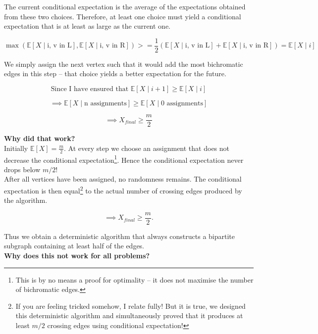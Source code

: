 The current conditional expectation is the average of the expectations obtained
from these two choices. Therefore, at least one choice must yield a conditional
expectation that is at least as large as the current one.

\[
\max \left( \mathbb E[X \mid \text{i, v in L}], \mathbb E[X \mid \text{i, v in R}] \right) >= \frac{1}{2} \left(\mathbb E[X \mid \text{i, v in L}] + \mathbb E[X \mid \text{i, v in R}] \right) = \mathbb E[X \mid i]
\]


We simply assign the next vertex such that it would add the most 
bichromatic edges in this step -- that choice yields a better expectation for the future.
\vspace{0.5em}

\[
\text{Since I have ensured that }\mathbb E[X \mid i+1] \ge \mathbb E[X \mid i]
\]

\[
\implies \mathbb E[X \mid \text{n assignments}] \ge \mathbb E[X \mid \text{0 assignments}]
\]

\[
\implies X_{final} \ge \frac{m}{2}
\]

\vspace{0.5em}

\noindent\textbf{Why did that work?}\\


\noindent Initially $\mathbb E[X]=\frac{m}{2}$. At every step we choose an 
assignment that does not decrease the conditional
expectation\footnote{This is by no means a proof for optimality -- it does not 
maximise the number of bichromatic edges.}. Hence the conditional expectation never drops below \(m/2\)!\\


\noindent After all vertices have been assigned, no randomness remains. The conditional
expectation is then equal\footnote{If you are feeling tricked somehow, 
I relate fully! But it is true, we designed this deterministic algorithm and simultaneously proved that 
it produces at least \(m/2\) crossing edges using conditional expectation!} to the 
actual number of crossing edges produced by the algorithm.

\[
\implies
X_{final} \ge \frac{m}{2}.
\]

\noindent Thus we obtain a deterministic algorithm that always constructs a bipartite
subgraph containing at least half of the edges.\\


\noindent\textbf{Why does this not work for all problems?}\\


